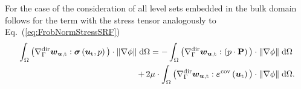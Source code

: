 \documentclass[12pt, twoside, english]{article}
\numberwithin{equation}{section}
\newcommand{\vek}[1]{\mathchoice{\displaystyle\boldsymbol#1}
{\textstyle\boldsymbol#1}{\scriptstyle\boldsymbol#1}
{\scriptscriptstyle\boldsymbol#1}}
\newcommand{\mat}[1]{\mathchoice{\displaystyle\mathbf#1}
{\textstyle\mathbf#1}{\scriptstyle\mathbf#1}
{\scriptscriptstyle\mathbf#1}}
\newcommand{\ti}{ \ensuremath{\mathrm{t} }}
\begin{document}
For the case of the consideration of all level sets embedded in the bulk domain follows for the term with the stress tensor analogously to Eq.~(\ref{eq:FrobNormStressSRF})
\begin{align}
	\begin{split}
		\int_{\Omega}\big(\nabla_{\Gamma}^{\mathrm{dir}}\vek{w}_{\vek{u},\ti}:\vek{\sigma}\left(\vek{u}_\ti,p\right)\big)\cdot \lVert \nabla \phi \rVert\;\mathrm{d}\Omega=-\int_{\Omega} \big(\nabla_{\Gamma}^{\mathrm{dir}}\vek{w}_{\vek{u},\ti}:\left(p\cdot\mat{P}\right) \big) \cdot \lVert \nabla \phi \rVert\; & \mathrm{d}\Omega \\ +\, 2\mu\cdot\int_{\Omega}\big(\nabla_{\Gamma}^{\mathrm{dir}}\vek{w}_{\vek{u},\ti}:\vek\varepsilon^{\mathrm{cov}}\left(\vek{u}_\ti\right)
	\big)\cdot \lVert \nabla \phi \rVert\; & \mathrm{d}\Omega. \label{eq:FrobNormStressBTF}
	\end{split}
\end{align}
\end{document}
